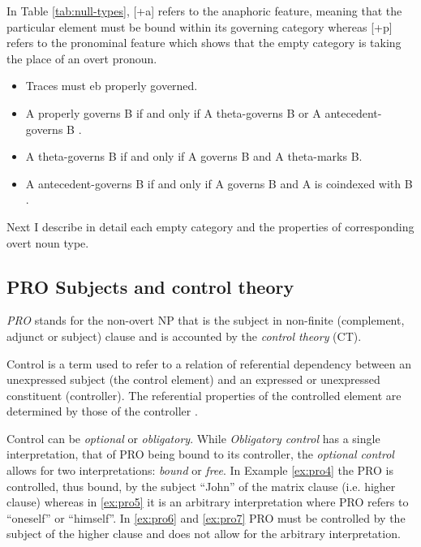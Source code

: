 In Table \ref{tab:null-types}, [+a] refers to the anaphoric feature, meaning that the particular element must be bound within its governing category whereas [+p] refers to the pronominal feature which shows that the empty category is taking the place of an overt pronoun.

\begin{definition}\label{def:ecp}
    \leavevmode
    \makeatletter
    \@nobreaktrue
    \makeatother
    \begin{itemize}
        \item Traces must eb properly governed.
        \item A properly governs B if and only if A theta-governs B or A antecedent-governs B \citep[17]{Chomsky1986}.
        \item A theta-governs B if and only if  A governs B and A theta-marks B.
        \item A antecedent-governs B if and only if A governs B and A is coindexed with B \citep[442]{Haegeman1991}.
    \end{itemize}
\end{definition}


Next I describe in detail each empty category and the properties of corresponding overt noun type. 


\subsection{PRO Subjects and control theory}
\label{sec:pro-mcg}
\textit{PRO} stands for the non-overt NP that is the subject in non-finite (complement, adjunct or subject) clause and is accounted by the \textit{control theory} (CT).

\begin{definition}[Control]\label{def:control}
	Control is a term used to refer to a relation of referential dependency between an unexpressed subject (the control element) and an expressed or unexpressed constituent (controller). The referential properties of the controlled element are determined by those of the controller \citep{Bresnan1982}.
\end{definition}

Control can be \textit{optional} or \textit{obligatory}. While \textit{Obligatory control} has a single interpretation, that of PRO being bound to its controller, the \textit{optional control} allows for two interpretations: \textit{bound} or \textit{free}. In Example \ref{ex:pro4} the PRO is controlled, thus bound, by the subject ``John'' of the matrix clause (i.e. higher clause) whereas in \ref{ex:pro5} it is an arbitrary interpretation where PRO refers to ``oneself'' or ``himself''. In \ref{ex:pro6} and \ref{ex:pro7} PRO must be controlled by the subject of the higher clause and does not allow for the arbitrary interpretation.

